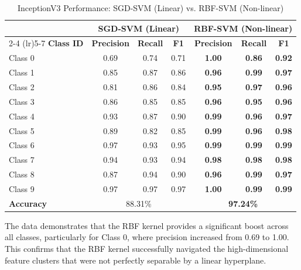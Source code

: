 \begin{table}[H]
    \centering
    \caption{InceptionV3 Performance: SGD-SVM (Linear) vs. RBF-SVM (Non-linear)}
    \label{tab:metrics_comparison}
    \begin{tabular}{lcccccc}
        \toprule
        & \multicolumn{3}{c}{\textbf{SGD-SVM (Linear)}} & \multicolumn{3}{c}{\textbf{RBF-SVM (Non-linear)}} \\
        \cmidrule(lr){2-4} \cmidrule(lr){5-7}
        \textbf{Class ID} & \textbf{Precision} & \textbf{Recall} & \textbf{F1} & \textbf{Precision} & \textbf{Recall} & \textbf{F1} \\
        \midrule
        Class 0 & 0.69 & 0.74 & 0.71 & \textbf{1.00} & \textbf{0.86} & \textbf{0.92} \\
        Class 1 & 0.85 & 0.87 & 0.86 & \textbf{0.96} & \textbf{0.99} & \textbf{0.97} \\
        Class 2 & 0.81 & 0.86 & 0.84 & \textbf{0.95} & \textbf{0.97} & \textbf{0.96} \\
        Class 3 & 0.86 & 0.85 & 0.85 & \textbf{0.96} & \textbf{0.95} & \textbf{0.96} \\
        Class 4 & 0.93 & 0.87 & 0.90 & \textbf{0.99} & \textbf{0.96} & \textbf{0.97} \\
        Class 5 & 0.89 & 0.82 & 0.85 & \textbf{0.99} & \textbf{0.96} & \textbf{0.98} \\
        Class 6 & 0.97 & 0.93 & 0.95 & \textbf{0.99} & \textbf{0.99} & \textbf{0.99} \\
        Class 7 & 0.94 & 0.93 & 0.94 & \textbf{0.98} & \textbf{0.98} & \textbf{0.98} \\
        Class 8 & 0.87 & 0.94 & 0.90 & \textbf{0.96} & \textbf{0.99} & \textbf{0.97} \\
        Class 9 & 0.97 & 0.97 & 0.97 & \textbf{1.00} & \textbf{0.99} & \textbf{0.99} \\
        \midrule
        \textbf{Accuracy} & \multicolumn{3}{c}{88.31\%} & \multicolumn{3}{c}{\textbf{97.24\%}} \\
        \bottomrule
    \end{tabular}
\end{table}

The data demonstrates that the RBF kernel provides a significant boost across all classes, particularly for Class 0, where precision increased from 0.69 to 1.00. This confirms that the RBF kernel successfully navigated the high-dimensional feature clusters that were not perfectly separable by a linear hyperplane.

